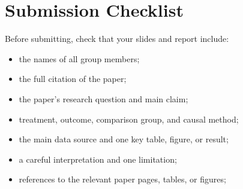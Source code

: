 \documentclass[12pt]{article}
\begin{document}



\section*{Submission Checklist}

Before submitting, check that your slides and report include:

\begin{itemize}
    \item the names of all group members;
    \item the full citation of the paper;
    \item the paper's research question and main claim;
    \item treatment, outcome, comparison group, and causal method;
    \item the main data source and one key table, figure, or result;
    \item a careful interpretation and one limitation;
    \item references to the relevant paper pages, tables, or figures;
\end{itemize}
\end{document}
